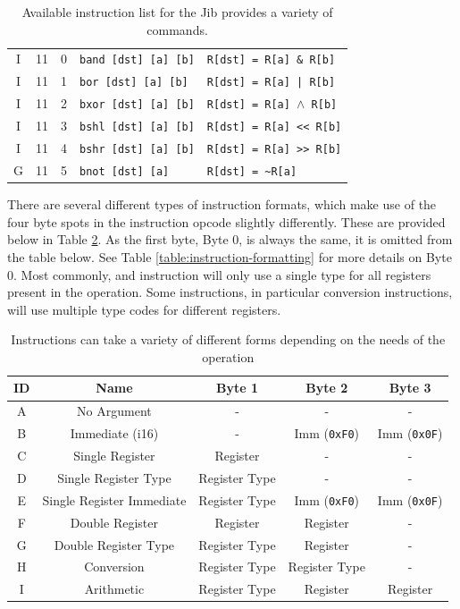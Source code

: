 \documentclass{article}
\begin{document}
\begin{table}[h!]
\begin{footnotesize}
\begin{tabular}{c|cc|l|l}
			I & 11 & 0 & \texttt{band [dst] [a] [b]} & \texttt{R[dst] = R[a] \& R[b]} \\
			I & 11 & 1 & \texttt{bor [dst] [a] [b]} & \texttt{R[dst] = R[a] | R[b]} \\
			I & 11 & 2 & \texttt{bxor [dst] [a] [b]} & \texttt{R[dst] = R[a] $\wedge$ R[b]} \\
			I & 11 & 3 & \texttt{bshl [dst] [a] [b]} & \texttt{R[dst] = R[a] << R[b]} \\
			I & 11 & 4 & \texttt{bshr [dst] [a] [b]} & \texttt{R[dst] = R[a] >> R[b]} \\
			G & 11 & 5 & \texttt{bnot [dst] [a]} & \texttt{R[dst] = \textasciitilde R[a]} \\
			\hline
		\end{tabular}
	\end{footnotesize}
	\caption{Available instruction list for the Jib provides a variety of commands.}
	\label{table:instruction-table}
\end{table}

There are several different types of instruction formats, which make use of the four byte spots in the instruction opcode slightly differently. These are provided below in Table \ref{table:instruction-format-types}. As the first byte, Byte 0, is always the same, it is omitted from the table below. See Table \ref{table:instruction-formatting} for more details on Byte 0. Most commonly, and instruction will only use a single type for all registers present in the operation. Some instructions, in particular conversion instructions, will use multiple type codes for different registers.

\begin{table}[h!]
	\centering
	\begin{tabular}{cc|ccc}
		\hline
		ID & Name & Byte 1 & Byte 2 & Byte 3 \\
		\hline
		A & No Argument & - & - & - \\
		B & Immediate (i16) & - & Imm (\texttt{0xF0}) & Imm (\texttt{0x0F}) \\
		C & Single Register & Register & - & - \\
		D & Single Register Type & Register Type & - & - \\
		E & Single Register Immediate & Register Type & Imm (\texttt{0xF0}) & Imm (\texttt{0x0F}) \\
		F & Double Register & Register & Register & - \\
		G & Double Register Type & Register Type & Register & - \\
		H & Conversion & Register Type & Register Type & - \\
		I & Arithmetic & Register Type & Register & Register \\
		\hline
	\end{tabular}
	\caption{Instructions can take a variety of different forms depending on the needs of the operation}
	\label{table:instruction-format-types}
\end{table}
\end{document}

